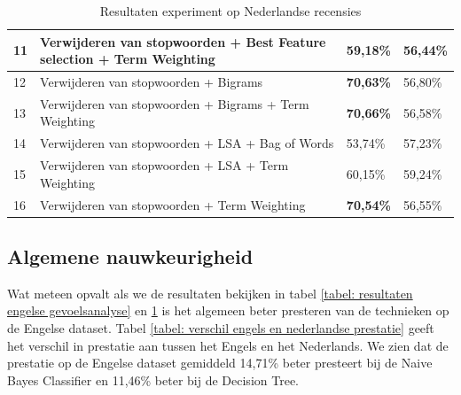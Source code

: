 \begin{table}[h]
\begin{adjustbox}{width=1\textwidth}
\begin{tabular}{|l|l|l|l|}
11       & Verwijderen van stopwoorden + Best Feature selection + Term Weighting         & 59,18\%                                 & 56,44\%                        \\ \hline
12       & Verwijderen van stopwoorden + Bigrams                                     & {\bf 70,63\%}                           & 56,80\%                        \\ \hline
13       & Verwijderen van stopwoorden + Bigrams + Term Weighting                    & {\bf 70,66\%}                           & 56,58\%                        \\ \hline
14       & Verwijderen van stopwoorden + LSA + Bag of Words                     & 53,74\%                                 & 57,23\%                        \\ \hline
15       & Verwijderen van stopwoorden + LSA + Term Weighting                            & 60,15\%                                 & 59,24\%                        \\ \hline
16       & Verwijderen van stopwoorden + Term Weighting                                         & {\bf 70,54\%}                           & 56,55\%                        \\ \hline
\end{tabular}
\end{adjustbox}

\caption{Resultaten experiment op Nederlandse recensies}
\label{tabel: resultaten Nederlandse gevoelsanalyse}
\end{table}

\subsection{Algemene nauwkeurigheid}

Wat meteen opvalt als we de resultaten bekijken in tabel \ref{tabel: resultaten engelse gevoelsanalyse} en \ref{tabel: resultaten Nederlandse gevoelsanalyse} is het algemeen beter presteren van de technieken op de Engelse dataset. Tabel \ref{tabel: verschil engels en nederlandse prestatie} geeft het verschil in prestatie aan tussen het Engels en het Nederlands. We zien dat de prestatie op de Engelse dataset gemiddeld 14,71\% beter presteert bij de Naive Bayes Classifier en 11,46\% beter bij de Decision Tree.


